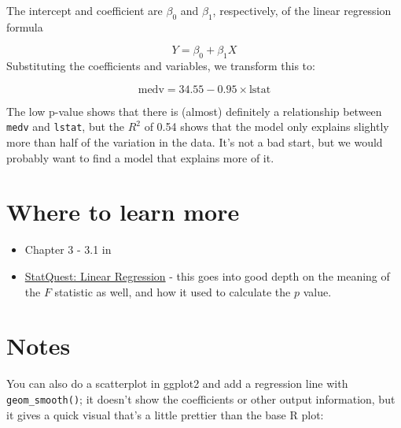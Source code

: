 \documentclass[
]{book}
\newenvironment{Shaded}{\begin{snugshade}}{\end{snugshade}}
\newcommand{\AttributeTok}[1]{\textcolor[rgb]{0.77,0.63,0.00}{#1}}
\newcommand{\FunctionTok}[1]{\textcolor[rgb]{0.00,0.00,0.00}{#1}}
\newcommand{\NormalTok}[1]{#1}
\newcommand{\SpecialCharTok}[1]{\textcolor[rgb]{0.00,0.00,0.00}{#1}}
\newcommand{\StringTok}[1]{\textcolor[rgb]{0.31,0.60,0.02}{#1}}
\providecommand{\tightlist}{%
  \setlength{\itemsep}{0pt}\setlength{\parskip}{0pt}}
\begin{document}
The intercept and coefficient are \(\beta_0\) and \(\beta_1\), respectively, of the linear regression formula

\[Y = \beta_0 + \beta_1X\]
Substituting the coefficients and variables, we transform this to:

\[\text{medv} = 34.55 - 0.95 \times \text{lstat}\]

The low p-value shows that there is (almost) definitely a relationship between \texttt{medv} and \texttt{lstat}, but the \(R^2\) of 0.54 shows that the model only explains slightly more than half of the variation in the data. It's not a bad start, but we would probably want to find a model that explains more of it.

\hypertarget{where-to-learn-more}{%
\section{Where to learn more}\label{where-to-learn-more}}

\begin{itemize}
\tightlist
\item
  Chapter 3 - 3.1 in \citet{ISLR}
\item
  \href{https://www.youtube.com/watch?v=nk2CQITm_eo}{StatQuest: Linear Regression} - this goes into good depth on the meaning of the \(F\) statistic as well, and how it used to calculate the \(p\) value.
\end{itemize}

\hypertarget{notes}{%
\section{Notes}\label{notes}}

You can also do a scatterplot in ggplot2 and add a regression line with \texttt{geom\_smooth()}; it doesn't show the coefficients or other output information, but it gives a quick visual that's a little prettier than the base R plot:

\begin{Shaded}
\end{Shaded}
\end{document}
